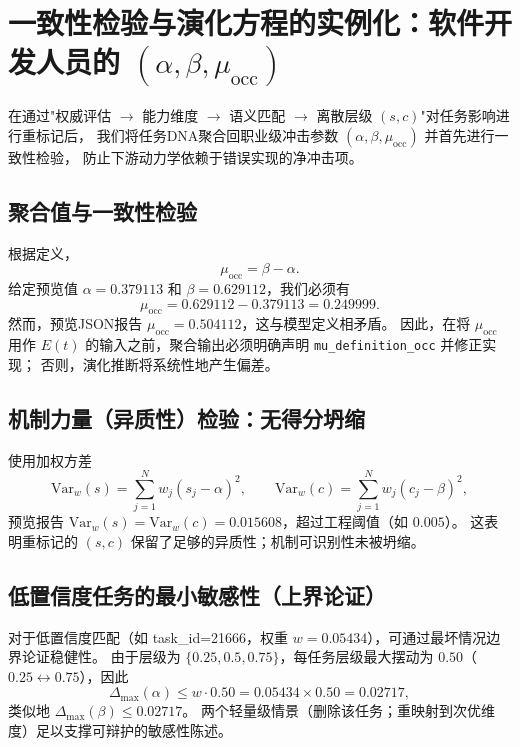 \section{一致性检验与演化方程的实例化：软件开发人员的 $(\alpha,\beta,\mu_{\mathrm{occ}})$}

在通过"权威评估 $\rightarrow$ 能力维度 $\rightarrow$ 语义匹配 $\rightarrow$ 离散层级 $(s,c)$"对任务影响进行重标记后，
我们将任务DNA聚合回职业级冲击参数 $(\alpha,\beta,\mu_{\mathrm{occ}})$ 并首先进行一致性检验，
防止下游动力学依赖于错误实现的净冲击项。

\subsection{聚合值与一致性检验}

根据定义，
\begin{equation}
    \mu_{\mathrm{occ}}=\beta-\alpha.
\end{equation}
给定预览值 $\alpha=0.379113$ 和 $\beta=0.629112$，我们必须有
\begin{equation}
    \mu_{\mathrm{occ}} = 0.629112-0.379113 = 0.249999.
\end{equation}
然而，预览JSON报告 $\mu_{\mathrm{occ}}=0.504112$，这与模型定义相矛盾。
因此，在将 $\mu_{\mathrm{occ}}$ 用作 $E(t)$ 的输入之前，聚合输出必须明确声明 \texttt{mu\_definition\_occ} 并修正实现；
否则，演化推断将系统性地产生偏差。

\subsection{机制力量（异质性）检验：无得分坍缩}

使用加权方差
\begin{equation}
    \mathrm{Var}_w(s)=\sum_{j=1}^{N} w_j (s_j-\alpha)^2,\qquad
    \mathrm{Var}_w(c)=\sum_{j=1}^{N} w_j (c_j-\beta)^2,
\end{equation}
预览报告 $\mathrm{Var}_w(s)=\mathrm{Var}_w(c)=0.015608$，超过工程阈值（如 $0.005$）。
这表明重标记的 $(s,c)$ 保留了足够的异质性；机制可识别性未被坍缩。

\subsection{低置信度任务的最小敏感性（上界论证）}

对于低置信度匹配（如 task\_id=21666，权重 $w=0.05434$），可通过最坏情况边界论证稳健性。
由于层级为 $\{0.25,0.5,0.75\}$，每任务层级最大摆动为 $0.50$（$0.25\leftrightarrow0.75$），因此
\begin{equation}
    \Delta_{\max}(\alpha)\le w\cdot 0.50 = 0.05434\times 0.50 = 0.02717,
\end{equation}
类似地 $\Delta_{\max}(\beta)\le 0.02717$。
两个轻量级情景（删除该任务；重映射到次优维度）足以支撑可辩护的敏感性陈述。

